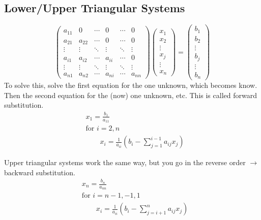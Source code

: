 \documentclass[12pt]{article}
\begin{document}
\subsection*{Lower/Upper Triangular Systems}
\begin{equation}
   \begin{pmatrix}
      a_{11} & 0      & \cdots & 0      & \cdots & 0 \\
      a_{21} & a_{22} & \cdots & 0      & \cdots & 0 \\
      \vdots & \vdots & \ddots & \vdots & \ddots & \vdots \\     
      a_{i1} & a_{i2} & \cdots & a_{ii} & \cdots & 0 \\
      \vdots & \vdots & \ddots & \vdots & \ddots & \vdots \\
      a_{n1} & a_{n2} & \cdots & a_{ni} & \cdots & a_{nn} 
    \end{pmatrix} 
    \begin{pmatrix} x_1 \\ x_2 \\ \vdots \\ x_j \\ \vdots \\ x_n \end{pmatrix} =
    \begin{pmatrix} b_1 \\ b_2 \\ \vdots \\ b_j \\ \vdots \\ b_n \end{pmatrix}
    \nonumber   
\end{equation} 
%
To solve this, solve the first equation for the one unknown, which becomes know. Then the second equation for the (now) one unknown, etc. This is called forward substitution.
%
\begin{align}
&x_1 = \frac{b_1}{a_{11}} \nonumber \\
&\text{for } i = 2, n \nonumber \\
&\qquad x_i = \frac{1}{a_{ii}}(b_i - \sum_{j=1}^{i-1} a_{ij} x_j) \nonumber
\end{align}

Upper triangular systems work the same way, but you go in the reverse order $\rightarrow$ backward substitution. 
%
\begin{align}
&x_n = \frac{b_n}{a_{nn}} \nonumber \\
&\text{for } i = n-1, -1, 1 \nonumber \\
&\qquad x_i = \frac{1}{a_{ii}}(b_i - \sum_{j=i+1}^{n} a_{ij} x_j) \nonumber
\end{align}
\end{document}
